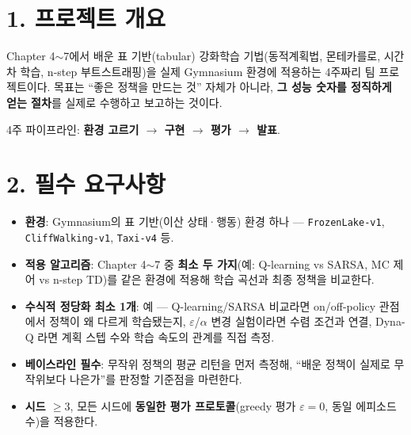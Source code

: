 \documentclass[12pt]{article}
\begin{document}

\section*{1. 프로젝트 개요}
Chapter 4$\sim$7에서 배운 표 기반(tabular) 강화학습 기법(동적계획법,
몬테카를로, 시간차 학습, n-step 부트스트래핑)을 실제 Gymnasium
환경에 적용하는 4주짜리 팀 프로젝트이다. 목표는 ``좋은 정책을
만드는 것'' 자체가 아니라, \textbf{그 성능 숫자를 정직하게 얻는
절차}를 실제로 수행하고 보고하는 것이다.

\vspace{4pt}
\noindent 4주 파이프라인: \textbf{환경 고르기 $\to$ 구현 $\to$
평가 $\to$ 발표}.

\section*{2. 필수 요구사항}
\begin{itemize}
\item \textbf{환경}: Gymnasium의 표 기반(이산 상태·행동) 환경
  하나 --- \texttt{FrozenLake-v1}, \texttt{CliffWalking-v1},
  \texttt{Taxi-v4} 등.
\item \textbf{적용 알고리즘}: Chapter 4$\sim$7 중 \textbf{최소 두
  가지}(예: Q-learning vs SARSA, MC 제어 vs n-step TD)를 같은
  환경에 적용해 학습 곡선과 최종 정책을 비교한다.
\item \textbf{수식적 정당화 최소 1개}: 예 --- Q-learning/SARSA
  비교라면 on/off-policy 관점에서 정책이 왜 다르게 학습됐는지,
  $\varepsilon$/$\alpha$ 변경 실험이라면 수렴 조건과 연결, Dyna-Q
  라면 계획 스텝 수와 학습 속도의 관계를 직접 측정.
\item \textbf{베이스라인 필수}: 무작위 정책의 평균 리턴을 먼저
  측정해, ``배운 정책이 실제로 무작위보다 나은가''를 판정할
  기준점을 마련한다.
\item \textbf{시드 $\ge 3$}, 모든 시드에 \textbf{동일한 평가
  프로토콜}(greedy 평가 $\varepsilon=0$, 동일 에피소드 수)을
  적용한다.
\end{itemize}

\newpage
\end{document}
